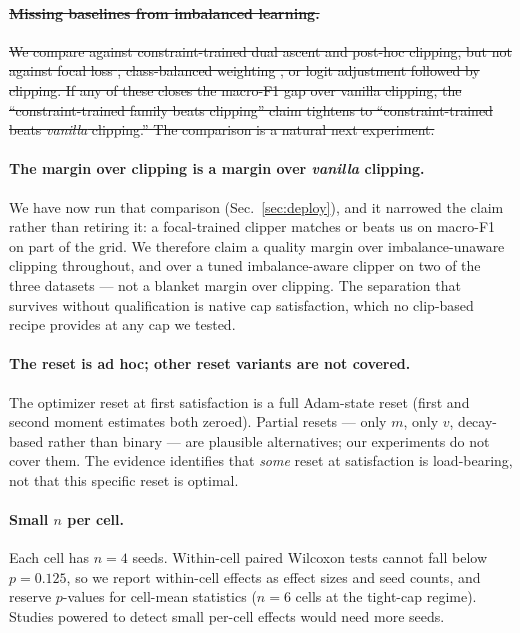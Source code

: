 \documentclass[10pt]{article}
\newcommand{\del}[1]{{\color{red}\sout{#1}}}
\begin{document}
\paragraph{\del{Missing baselines from imbalanced learning.}}\leavevmode
\del{We compare against constraint-trained dual ascent and post-hoc clipping,
but not against focal loss \mbox{\citep{lin2017focal}}, class-balanced weighting
\mbox{\citep{cui2019class}}, or logit adjustment \mbox{\citep{menon2020long}} followed
by clipping. If any of these closes the macro-F1 gap over vanilla
clipping, the ``constraint-trained family beats clipping'' claim
tightens to ``constraint-trained beats \emph{vanilla} clipping.''
The comparison is a natural next experiment.}

{\color{blue}
\paragraph{The margin over clipping is a margin over \emph{vanilla} clipping.}
We have now run that comparison (Sec.~\ref{sec:deploy}), and it narrowed the claim
rather than retiring it: a focal-trained clipper matches or beats us on macro-F1 on
part of the grid. We therefore claim a quality margin over imbalance-unaware
clipping throughout, and over a tuned imbalance-aware clipper on two of the three
datasets --- not a blanket margin over clipping. The separation that survives
without qualification is native cap satisfaction, which no clip-based recipe
provides at any cap we tested.}

\paragraph{The reset is ad hoc; other reset variants are not covered.}
The optimizer reset at first satisfaction is a full Adam-state reset
(first and second moment estimates both zeroed). Partial resets --- only
$m$, only $v$, decay-based rather than binary --- are plausible
alternatives; our experiments do not cover them. The evidence identifies
that \emph{some} reset at satisfaction is load-bearing, not that this
specific reset is optimal.

\paragraph{Small $n$ per cell.}
Each cell has $n{=}4$ seeds. Within-cell paired Wilcoxon tests cannot
fall below $p{=}0.125$, so we report within-cell effects as effect sizes
and seed counts, and reserve $p$-values for cell-mean statistics ($n{=}6$
cells at the tight-cap regime). Studies powered to detect small
per-cell effects would need more seeds.
\end{document}
